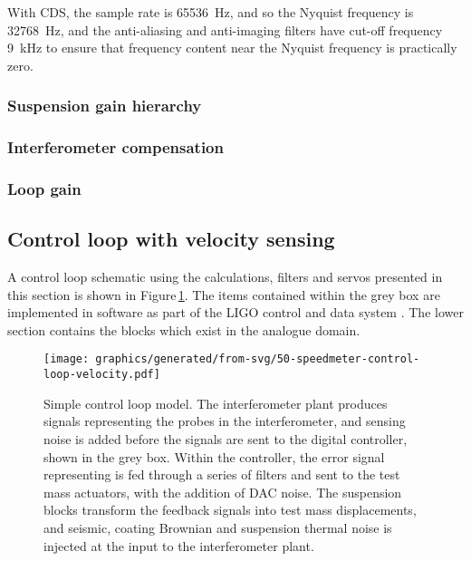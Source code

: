 With \gls{CDS}, the sample rate is \SI{65536}{\hertz}, and so the Nyquist frequency is \SI{32768}{\hertz}, and the anti-aliasing and anti-imaging filters have cut-off frequency \SI{9}{\kilo\hertz} to ensure that frequency content near the Nyquist frequency is practically zero.


\subsubsection{Suspension gain hierarchy}

\subsubsection{Interferometer compensation}

\subsubsection{Loop gain}

\subsection{Control loop with velocity sensing}

A control loop schematic using the calculations, filters and servos presented in this section is shown in Figure\,\ref{fig:ssm-control-loop-velocity}. The items contained within the grey box are implemented in software as part of the LIGO control and data system \cite{Bork2010}. The lower section contains the blocks which exist in the analogue domain.

\begin{figure}
  \texttt{[image: graphics/generated/from-svg/50-speedmeter-control-loop-velocity.pdf]}
  \caption{\label{fig:ssm-control-loop-velocity}Simple \SSM{} control loop model. The interferometer plant produces signals representing the probes in the interferometer, and sensing noise is added before the signals are sent to the digital controller, shown in the grey box. Within the controller, the error signal representing \LMINUS{} is fed through a series of filters and sent to the test mass actuators, with the addition of \gls{DAC} noise. The suspension blocks transform the feedback signals into test mass displacements, and seismic, coating Brownian and suspension thermal noise is injected at the input to the interferometer plant. }
\end{figure}

